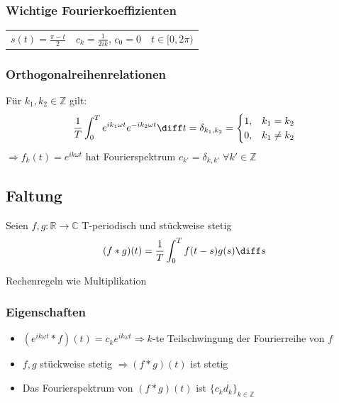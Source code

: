 \begin{sectionbox}
    \subsubsection{Wichtige Fourierkoeffizienten}
    \begin{tabularx}{\linewidth}{lll}
        $s(t) = \frac{\pi - t}{2}$ & $c_k = \frac{1}{2ik}, \, c_0=0$ & $t\in[0,2\pi)$
    \end{tabularx}

    \subsubsection{Orthogonalreihenrelationen}
    Für $k_1, k_2 \in \mathbb Z$ gilt:
    \begin{equation*}
        \frac{1}{T}\int_0^Te^{ik_1\omega t}e^{-ik_2\omega t}\diff t = \delta_{k_1,k_2}=\begin{cases}
            1, & k_1=k_2    \\
            0, & k_1\ne k_2
        \end{cases}
    \end{equation*}
    $\Rightarrow f_k(t)=e^{ik\omega t}$ hat Fourierspektrum $c_{k'}=\delta_{k,k'} \; \forall k' \in \mathbb Z$
\end{sectionbox}


\subsection{Faltung}
\begin{emphbox}
    Seien $f,g : \mathbb R \rightarrow\mathbb C$ T-periodisch und stückweise stetig
    \begin{equation*}
        (f * g)(t) = \frac{1}{T}\int_0^T f(t-s)g(s)\diff s
    \end{equation*}
\end{emphbox}
Rechenregeln wie Multiplikation

\begin{sectionbox}
    \subsubsection{Eigenschaften}
    \begin{itemize}
        \item $(e^{ik\omega t} * f)(t)=c_ke^{ik\omega t} \Rightarrow k$-te Teilschwingung der Fourierreihe von $f$
        \item $f,g$ stückweise stetig $\Rightarrow (f * g)(t)$ ist stetig
        \item Das Fourierspektrum von $(f * g)(t)$ ist $\{c_kd_k\}_{k\in\mathbb Z}$
    \end{itemize}
\end{sectionbox}


